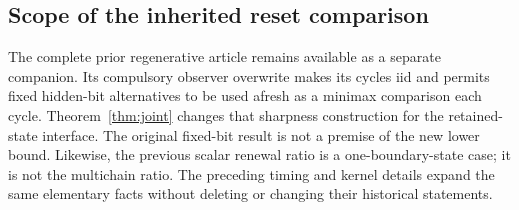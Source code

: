\subsection{Scope of the inherited reset comparison}
The complete prior regenerative article remains available as a separate companion. Its compulsory observer overwrite makes its cycles iid and permits fixed hidden-bit alternatives to be used afresh as a minimax comparison each cycle. Theorem~\ref{thm:joint} changes that sharpness construction for the retained-state interface. The original fixed-bit result is not a premise of the new lower bound. Likewise, the previous scalar renewal ratio is a one-boundary-state case; it is not the multichain ratio. The preceding timing and kernel details expand the same elementary facts without deleting or changing their historical statements.
